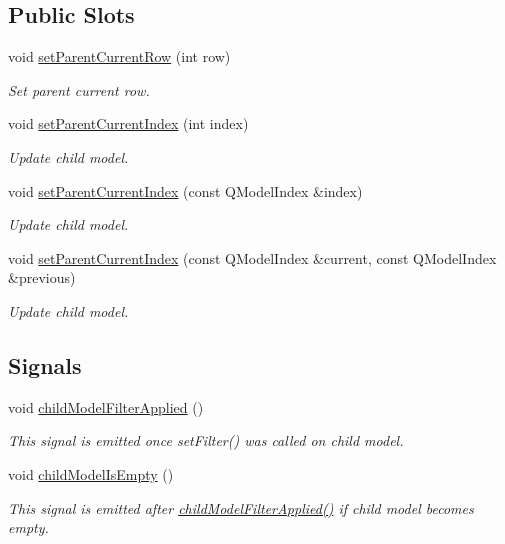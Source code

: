 \subsection*{Public Slots}
\begin{DoxyCompactItemize}
\item 
void \hyperlink{classmdt_sql_relation_a583cbae232142029eeacffaac7bb5978}{set\-Parent\-Current\-Row} (int row)
\begin{DoxyCompactList}\small\item\em Set parent current row. \end{DoxyCompactList}\item 
void \hyperlink{classmdt_sql_relation_a39fbecb027a5783277df1cc995485917}{set\-Parent\-Current\-Index} (int index)
\begin{DoxyCompactList}\small\item\em Update child model. \end{DoxyCompactList}\item 
void \hyperlink{classmdt_sql_relation_a4381f7f5bd39337fa5cbccf9b87ff0f6}{set\-Parent\-Current\-Index} (const Q\-Model\-Index \&index)
\begin{DoxyCompactList}\small\item\em Update child model. \end{DoxyCompactList}\item 
void \hyperlink{classmdt_sql_relation_a82a90b12bb78a4b0f9751244f134889d}{set\-Parent\-Current\-Index} (const Q\-Model\-Index \&current, const Q\-Model\-Index \&previous)
\begin{DoxyCompactList}\small\item\em Update child model. \end{DoxyCompactList}\end{DoxyCompactItemize}
\subsection*{Signals}
\begin{DoxyCompactItemize}
\item 
void \hyperlink{classmdt_sql_relation_a86656619d8156638ebfbde2b334d40e2}{child\-Model\-Filter\-Applied} ()
\begin{DoxyCompactList}\small\item\em This signal is emitted once set\-Filter() was called on child model. \end{DoxyCompactList}\item 
void \hyperlink{classmdt_sql_relation_ae30eb691c46263cb4021f55b03d0d111}{child\-Model\-Is\-Empty} ()
\begin{DoxyCompactList}\small\item\em This signal is emitted after \hyperlink{classmdt_sql_relation_a86656619d8156638ebfbde2b334d40e2}{child\-Model\-Filter\-Applied()} if child model becomes empty. \end{DoxyCompactList}\end{DoxyCompactItemize}

